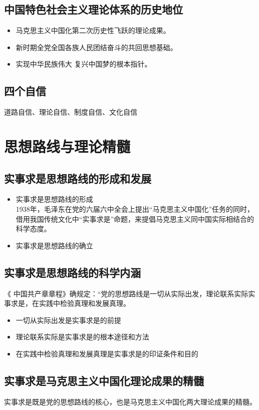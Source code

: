 \subsection{中国特色社会主义理论体系的历史地位}
\begin{itemize}
\item 马克思主义中国化第二次历史性飞跃的理论成果。
\item 新时期全党全国各族人民团结奋斗的共回思想基础。
\item 实现中华民族伟大 复兴中国梦的根本指针。
\end{itemize}
\subsection{四个自信}
道路自信、理论自信、制度自信、文化自信
\section{思想路线与理论精髓}
\subsection{实事求是思想路线的形成和发展}
\begin{itemize}
	\item 实事求是思想路线的形成\\
	1938年，毛泽东在党的六届六中全会上提出“马克思主义中国化”任务的同时，借用我国传统文化中“实事求是”命题，来提倡马克思主义同中国实际相结合的科学态度。
	\item 实事求是思想路线的确立
\end{itemize}
\subsection{实事求是思想路线的科学内涵}
《 中国共产章章程》确规定：“党的思想路线是一切从实际出发，理论联系实际实事求是，在实践中检验真理和发展真理。
\begin{itemize}
	\item 一切从实际出发是实事求是的前提
	\item 理论联系实际是实事求是的根本途径和方法
	\item 在实践中检验真理和发展真理是实事求是的印证条件和目的
\end{itemize}
\subsection{实事求是马克思主义中国化理论成果的精髓}
实事求是既是党的思想路线的核心，也是马克思主义中国化两大理论成果的精髓。

